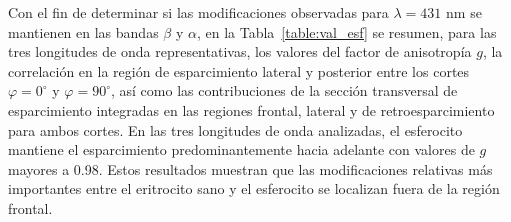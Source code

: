 Con el fin de determinar si las modificaciones observadas para $\lambda=431$ nm se mantienen en las bandas $\beta$ y $\alpha$, en la Tabla~\ref{table:val_esf} se resumen, para las tres longitudes de onda representativas, los valores del factor de anisotropía $g$, la correlación en la región de esparcimiento lateral y posterior entre los cortes $\varphi=0^\circ$ y $\varphi=90^\circ$, así como las contribuciones de la sección transversal de esparcimiento integradas en las regiones frontal, lateral y de retroesparcimiento para ambos cortes. En las tres longitudes de onda analizadas, el esferocito mantiene el esparcimiento predominantemente hacia adelante con valores de $g$ mayores a 0.98. Estos resultados muestran que las modificaciones relativas más importantes entre el eritrocito sano y el esferocito se localizan fuera de la región frontal.

